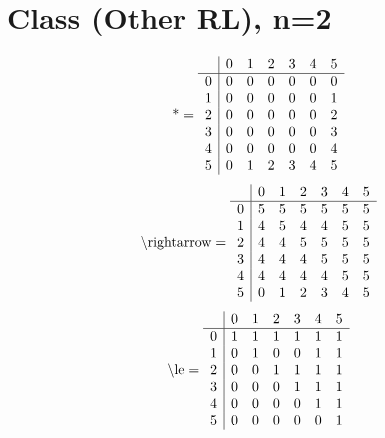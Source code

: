 \documentclass[11pt]{article}
\begin{document}
\section{Class (Other RL), n=2}
\[\text{*} = 
\begin{array}{r | r r r r r r}
 & 0 & 1 & 2 & 3 & 4 & 5 \\ \hline
0 & 0 & 0 & 0 & 0 & 0 & 0 \\
1 & 0 & 0 & 0 & 0 & 0 & 1 \\
2 & 0 & 0 & 0 & 0 & 0 & 2 \\
3 & 0 & 0 & 0 & 0 & 0 & 3 \\
4 & 0 & 0 & 0 & 0 & 0 & 4 \\
5 & 0 & 1 & 2 & 3 & 4 & 5 \\
\end{array}
\]
\[\text{\textbackslash rightarrow} = 
\begin{array}{r | r r r r r r}
 & 0 & 1 & 2 & 3 & 4 & 5 \\ \hline
0 & 5 & 5 & 5 & 5 & 5 & 5 \\
1 & 4 & 5 & 4 & 4 & 5 & 5 \\
2 & 4 & 4 & 5 & 5 & 5 & 5 \\
3 & 4 & 4 & 4 & 5 & 5 & 5 \\
4 & 4 & 4 & 4 & 4 & 5 & 5 \\
5 & 0 & 1 & 2 & 3 & 4 & 5 \\
\end{array}
\]
\[\text{\textbackslash le} = 
\begin{array}{r | r r r r r r}
 & 0 & 1 & 2 & 3 & 4 & 5 \\ \hline
0 & 1 & 1 & 1 & 1 & 1 & 1 \\
1 & 0 & 1 & 0 & 0 & 1 & 1 \\
2 & 0 & 0 & 1 & 1 & 1 & 1 \\
3 & 0 & 0 & 0 & 1 & 1 & 1 \\
4 & 0 & 0 & 0 & 0 & 1 & 1 \\
5 & 0 & 0 & 0 & 0 & 0 & 1 \\
\end{array}
\]
\end{document}

